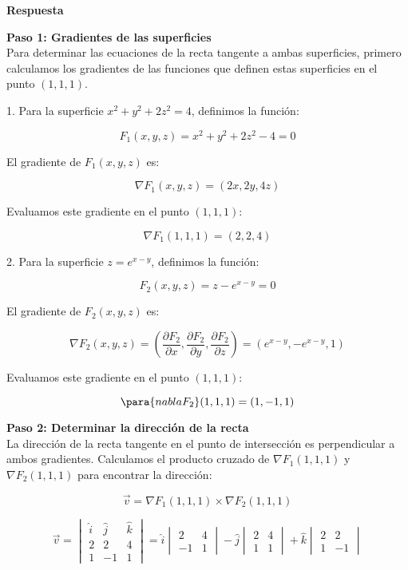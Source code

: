 \documentclass{report}
\begin{document}
    \textbf{Respuesta}

    \textbf{Paso 1: Gradientes de las superficies}\\
    Para determinar las ecuaciones de la recta tangente a ambas superficies, primero calculamos los gradientes de las funciones que definen estas superficies en el punto $(1,1,1)$.

    1. Para la superficie $x^2 + y^2 + 2z^2 = 4$, definimos la función:

    \[
    F_1(x, y, z) = x^2 + y^2 + 2z^2 - 4 = 0
    \]

    El gradiente de $F_1(x, y, z)$ es:

    \[
    \nabla F_1(x, y, z) = (2x, 2y, 4z)
    \]

    Evaluamos este gradiente en el punto $(1,1,1)$:

    \[
    \nabla F_1(1, 1, 1) = (2, 2, 4)
    \]

    2. Para la superficie $z = e^{x - y}$, definimos la función:

    \[
    F_2(x, y, z) = z - e^{x - y} = 0
    \]

    El gradiente de $F_2(x, y, z)$ es:

    \[
    \nabla F_2(x, y, z) = \left( \frac{\partial F_2}{\partial x}, \frac{\partial F_2}{\partial y}, \frac{\partial F_2}{\partial z} \right) = \left( e^{x - y}, -e^{x - y}, 1 \right)
    \]

    Evaluamos este gradiente en el punto $(1, 1, 1)$:

    \[
    \para{nabla F_2}(1, 1, 1) = (1, -1, 1)
    \]

    \textbf{Paso 2: Determinar la dirección de la recta}\\
    La dirección de la recta tangente en el punto de intersección es perpendicular a ambos gradientes. Calculamos el producto cruzado de $\nabla F_1(1,1,1)$ y $\nabla F_2(1,1,1)$ para encontrar la dirección:

    \[
    \vec{v} = \nabla F_1(1,1,1) \times \nabla F_2(1,1,1)
    \]

    \[
    \vec{v} = \begin{vmatrix}
    \hat{i} & \hat{j} & \hat{k} \\
    2 & 2 & 4 \\
    1 & -1 & 1
    \end{vmatrix}
    = \hat{i} \begin{vmatrix} 2 & 4 \\ -1 & 1 \end{vmatrix} 
    - \hat{j} \begin{vmatrix} 2 & 4 \\ 1 & 1 \end{vmatrix} 
    + \hat{k} \begin{vmatrix} 2 & 2 \\ 1 & -1 \end{vmatrix}
    \]
\end{document}
